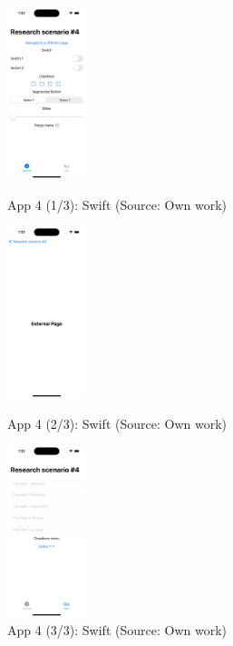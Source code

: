 \begin{figure}[H]
  \begin{minipage}{.31\textwidth}
    \centering
    \includegraphics[height=50mm]{img/app4_1_swift}
    \caption{App 4 (1/3): Swift (Source: Own work)}
    \label{fig:app4_1_swift}
  \end{minipage}
  \hfill
  \begin{minipage}{.31\textwidth}
    \centering
    \includegraphics[height=50mm]{img/app4_2_swift}
    \caption{App 4 (2/3): Swift (Source: Own work)}
    \label{fig:app4_2_swift}
  \end{minipage}
  \hfill
  \begin{minipage}{.31\textwidth}
    \centering
    \includegraphics[height=50mm]{img/app4_3_swift}
    \caption{App 4 (3/3): Swift (Source: Own work)}
    \label{fig:app4_3_swift}
  \end{minipage}
\end{figure}

